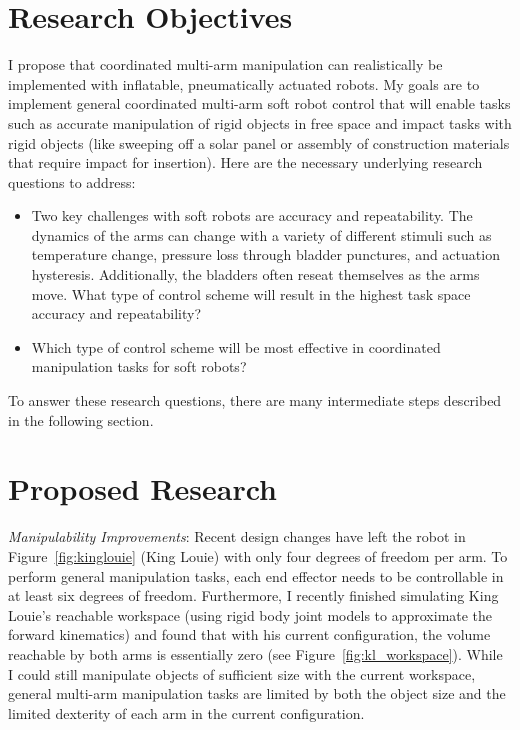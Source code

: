 \documentclass[12pt, letterpaper]{article}
\begin{document}
\section{Research Objectives}
I propose that coordinated multi-arm manipulation can realistically be implemented with inflatable, pneumatically actuated robots. My goals are to implement general coordinated multi-arm soft robot control that will enable tasks such as accurate manipulation of rigid objects in free space and impact tasks with rigid objects (like sweeping off a solar panel or assembly of construction materials that require impact for insertion). Here are the necessary underlying research questions to address:
\begin{itemize}
\item Two key challenges with soft robots are accuracy and repeatability. The dynamics of the arms can change with a variety of different stimuli such as temperature change, pressure loss through bladder punctures, and actuation hysteresis. Additionally, the bladders often reseat themselves as the arms move. What type of control scheme will result in the highest task space accuracy and repeatability?
\item Which type of control scheme will be most effective in coordinated manipulation tasks for soft robots?
\end{itemize}
To answer these research questions, there are many intermediate steps described in the following section.

\section{Proposed Research}
\textit{Manipulability Improvements}: Recent design changes have left the robot in Figure~\ref{fig:kinglouie} (King Louie) with only four degrees of freedom per arm. To perform general manipulation tasks, each end effector needs to be controllable in at least six degrees of freedom. Furthermore, I recently finished simulating King Louie's reachable workspace (using rigid body joint models to approximate the forward kinematics) and found that  with his current configuration, the volume reachable by both arms is essentially zero (see Figure~\ref{fig:kl_workspace}). While I could still manipulate objects of sufficient size with the current workspace, general multi-arm manipulation tasks are limited by both the object size and the limited dexterity of each arm in the current configuration.
\end{document}

